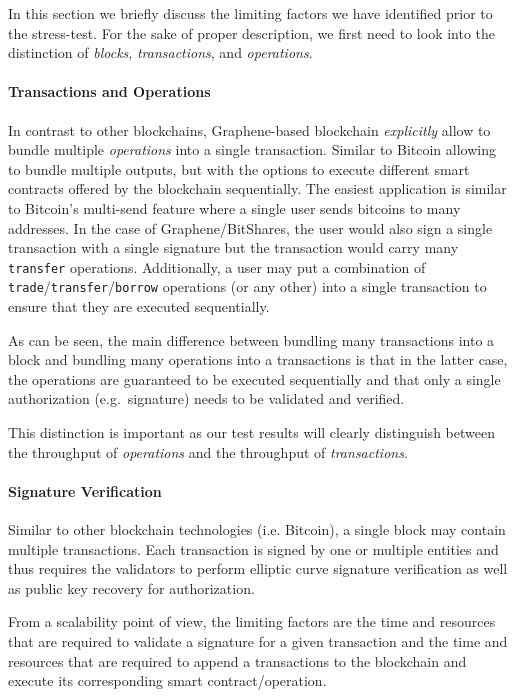In this section we briefly discuss the limiting factors we have identified
prior to the stress-test. For the sake of proper description, we first need to
look into the distinction of \emph{blocks}, \emph{transactions}, and
\emph{operations}.

\paragraph{Transactions and Operations}
In contrast to other blockchains, Graphene-based blockchain \emph{explicitly}
allow to bundle multiple \emph{operations} into a single transaction. Similar
to Bitcoin allowing to bundle multiple outputs, but with the options to execute
different smart contracts offered by the blockchain sequentially. The easiest
application is similar to Bitcoin's multi-send feature where a single user
sends bitcoins to many addresses. In the case of Graphene/BitShares, the user
would also sign a single transaction with a single signature but the
transaction would carry many \texttt{transfer} operations. Additionally, a
user may put a combination of \texttt{trade}/\texttt{transfer}/\texttt{borrow}
operations (or any other) into a single transaction to ensure that they are
executed sequentially.

As can be seen, the main difference between bundling many transactions into a
block and bundling many operations into a transactions is that in the latter
case, the operations are guaranteed to be executed sequentially and that only a
single authorization (e.g.\ signature) needs to be validated and verified.

This distinction is important as our test results will clearly distinguish
between the throughput of \emph{operations} and the throughput of
\emph{transactions}.

\paragraph{Signature Verification}
Similar to other blockchain technologies (i.e. Bitcoin), a single block may
contain multiple transactions. Each transaction is signed by one or multiple
entities and thus requires the validators to perform elliptic curve signature
verification as well as public key recovery for authorization.

From a scalability point of view, the limiting factors are the time and
resources that are required to validate a signature for a given transaction and
the time and resources that are required to append a transactions to the
blockchain and execute its corresponding smart contract/operation.

